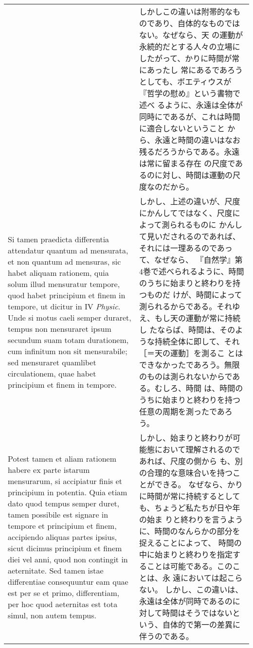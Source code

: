 \documentclass[10pt]{jsarticle} %
\begin{document}
\begin{longtable}{p{21em}p{21em}}
&

しかしこの違いは附帯的なものであり、自体的なものではない。なぜなら、天
の運動が永続的だとする人々の立場にしたがって、かりに時間が常にあったし
常にあるであろうとしても、ボエティウスが『哲学の慰め』という書物で述べ
るように、永遠は全体が同時にであるが、これは時間に適合しないということ
から、永遠と時間の違いはなお残るだろうからである。永遠は常に留まる存在
の尺度であるのに対し、時間は運動の尺度なのだから。

\\

Si tamen praedicta differentia attendatur quantum ad mensurata, et non
quantum ad mensuras, sic habet aliquam rationem, quia solum illud
mensuratur tempore, quod habet principium et finem in tempore, ut
dicitur in IV {\it Physic}. Unde si motus caeli semper duraret, tempus
non mensuraret ipsum secundum suam totam durationem, cum infinitum non
sit mensurabile; sed mensuraret quamlibet circulationem, quae habet
principium et finem in tempore.

&

しかし、上述の違いが、尺度にかんしてではなく、尺度によって測られるものに
かんして見いだされるのであれば、それには一理あるのであって、なぜなら、
『自然学』第4巻で述べられるように、時間のうちに始まりと終わりを持つものだ
けが、時間によって測られるからである。それゆえ、もし天の運動が常に持続し
たならば、時間は、そのような持続全体に即して、それ［＝天の運動］を測るこ
とはできなかったであろう。無限のものは測られないからである。むしろ、時間
は、時間のうちに始まりと終わりを持つ任意の周期を測ったであろう。



\\



Potest tamen et aliam rationem habere ex parte istarum mensurarum, si
accipiatur finis et principium in potentia. Quia etiam dato quod tempus
semper duret, tamen possibile est signare in tempore et principium et
finem, accipiendo aliquas partes ipsius, sicut dicimus principium et
finem diei vel anni, quod non contingit in aeternitate. Sed tamen istae
differentiae consequuntur eam quae est per se et primo, differentiam,
per hoc quod aeternitas est tota simul, non autem tempus.

&

しかし、始まりと終わりが可能態において理解されるのであれば、尺度の側から
も、別の合理的な意味合いを持つことができる。
なぜなら、かりに時間が常に持続するとしても、ちょうど私たちが日や年の始ま
りと終わりを言うように、時間のなんらかの部分を捉えることによって、
時間の中に始まりと終わりを指定することは可能である。このことは、永
遠においては起こらない。
しかし、この違いは、永遠は全体が同時であるのに対して時間はそうではないと
いう、自体的で第一の差異に伴うのである。


\end{longtable}
\end{document}
